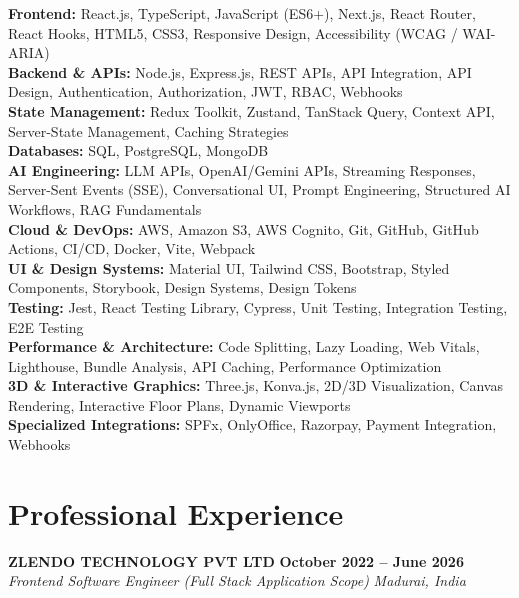 \documentclass[letterpaper,10pt]{article}
\newcommand{\resumeSubheading}[4]{%
  \vspace{1pt}%
  \textbf{#1} \hfill \textbf{#2}\\
  \textit{#3} \hfill \textit{#4}\\[-3pt]
}
\begin{document}
\textbf{Frontend:} React.js, TypeScript, JavaScript (ES6+), Next.js, React Router, React Hooks, HTML5, CSS3, Responsive Design, Accessibility (WCAG / WAI-ARIA)\\
\textbf{Backend \& APIs:} Node.js, Express.js, REST APIs, API Integration, API Design, Authentication, Authorization, JWT, RBAC, Webhooks\\
\textbf{State Management:} Redux Toolkit, Zustand, TanStack Query, Context API, Server-State Management, Caching Strategies\\
\textbf{Databases:} SQL, PostgreSQL, MongoDB\\
\textbf{AI Engineering:} LLM APIs, OpenAI/Gemini APIs, Streaming Responses, Server-Sent Events (SSE), Conversational UI, Prompt Engineering, Structured AI Workflows, RAG Fundamentals\\
\textbf{Cloud \& DevOps:} AWS, Amazon S3, AWS Cognito, Git, GitHub, GitHub Actions, CI/CD, Docker, Vite, Webpack\\
\textbf{UI \& Design Systems:} Material UI, Tailwind CSS, Bootstrap, Styled Components, Storybook, Design Systems, Design Tokens\\
\textbf{Testing:} Jest, React Testing Library, Cypress, Unit Testing, Integration Testing, E2E Testing\\
\textbf{Performance \& Architecture:} Code Splitting, Lazy Loading, Web Vitals, Lighthouse, Bundle Analysis, API Caching, Performance Optimization\\
\textbf{3D \& Interactive Graphics:} Three.js, Konva.js, 2D/3D Visualization, Canvas Rendering, Interactive Floor Plans, Dynamic Viewports\\
\textbf{Specialized Integrations:} SPFx, OnlyOffice, Razorpay, Payment Integration, Webhooks


\section{Professional Experience}

\resumeSubheading
  {ZLENDO TECHNOLOGY PVT LTD}{October 2022 -- June 2026}
  {Frontend Software Engineer (Full Stack Application Scope)}{Madurai, India}
\end{document}
